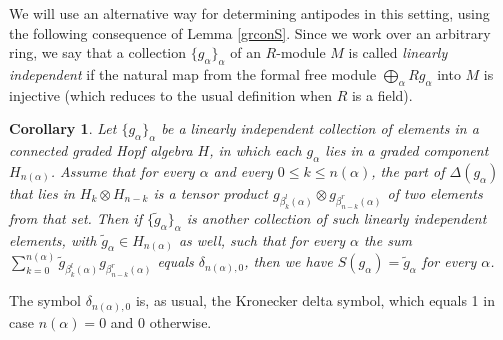\documentclass{article}
\newtheorem{cor}[thm]{Corollary}
\theoremstyle{definition}
\begin{document}
We will use an alternative way for determining antipodes in this setting, using the following consequence of Lemma \ref{grconS}. Since we work over an arbitrary ring, we say that a collection $\{g_{\alpha}\}_{\alpha}$ of an $R$-module $M$ is called \emph{linearly independent} if the natural map from the formal free module $\bigoplus_{\alpha}Rg_{\alpha}$ into $M$ is injective (which reduces to the usual definition when $R$ is a field).
\begin{cor}
Let $\{g_{\alpha}\}_{\alpha}$ be a linearly independent collection of elements in a connected graded Hopf algebra $H$, in which each $g_{\alpha}$ lies in a graded component $H_{n(\alpha)}$. Assume that for every $\alpha$ and every $0 \leq k \leq n(\alpha)$, the part of $\Delta(g_{\alpha})$ that lies in $H_{k} \otimes H_{n-k}$ is a tensor product $g_{\beta_{k}^{l}(\alpha)} \otimes g_{\beta_{n-k}^{r}(\alpha)}$ of two elements from that set. Then if $\{\tilde{g}_{\alpha}\}_{\alpha}$ is another collection of such linearly independent elements, with $\tilde{g}_{\alpha} \in H_{n(\alpha)}$ as well, such that for every $\alpha$ the sum $\sum_{k=0}^{n(\alpha)}\tilde{g}_{\beta_{k}^{l}(\alpha)}g_{\beta_{n-k}^{r}(\alpha)}$ equals $\delta_{n(\alpha),0}$, then we have $S(g_{\alpha})=\tilde{g}_{\alpha}$ for every $\alpha$. \label{detS}
\end{cor}
The symbol $\delta_{n(\alpha),0}$ is, as usual, the Kronecker delta symbol, which equals 1 in case $n(\alpha)=0$ and 0 otherwise.
\end{document}
